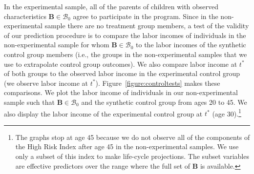 \begin{figure}
\end{figure}

\noindent In the experimental sample, all of the parents of children with observed characteristics $\bm{B} \in \mathcal{B}_0$ agree to participate in the program. Since in the non-experimental sample there are no treatment group members, a test of the validity of our prediction procedure is to compare the labor incomes of individuals in the non-experimental sample for whom $\bm{B} \in \mathcal{B}_0$ to the labor incomes of the synthetic control group members (i.e., the groups in the non-experimental samples that we use to extrapolate control group outcomes). We also compare labor income at $t^*$ of both groups to the observed labor income in the experimental control group (we observe labor income at $t^*$). Figure~\ref{figure:controltests} makes these comparisons. We plot the labor income of individuals in our non-experimental sample such that $\bm{B} \in \mathcal{B}_0$ and the synthetic control group from ages 20 to 45. We also display the labor income of the experimental control group at $t^*$ (age 30).\footnote{The graphs stop at age 45 because we do not observe all of the components of the High Risk Index after age 45 in the non-experimental samples. We use only a subset of this index to make life-cycle projections. The subset variables are effective predictors over the range where the full set of $\bm{B}$ is available.}

